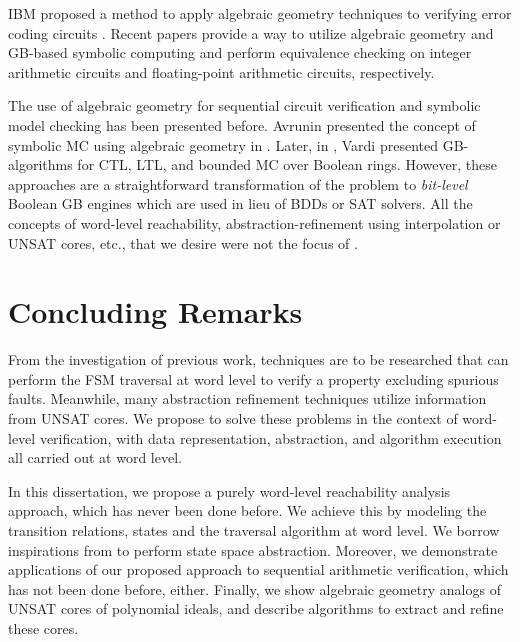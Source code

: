 IBM proposed a method to apply algebraic geometry techniques 
to verifying error coding circuits \cite{BLUEVERI}.
Recent papers \cite{rolf:date16,rolf:FMCAD16} provide a way to utilize 
algebraic geometry and GB-based symbolic computing and perform 
equivalence checking on integer arithmetic circuits and floating-point 
arithmetic circuits, respectively.

The use of algebraic geometry
for sequential circuit verification and symbolic model checking has
been presented before. Avrunin presented the
concept of symbolic MC using algebraic geometry in
\cite{Avrunin:CAV}. Later, in \cite{vardi-iasted07}, Vardi presented
GB-algorithms for CTL, LTL, and 
bounded MC over Boolean rings. However, these approaches are a
straightforward transformation of the problem to {\it bit-level}
Boolean GB engines which are used in lieu of BDDs or SAT solvers. All
the concepts of word-level reachability, abstraction-refinement using
interpolation or UNSAT cores, etc., that we desire were not the focus of
\cite{Avrunin:CAV,vardi-iasted07}. 

\section{Concluding Remarks}
From the investigation of previous work, techniques are to be researched that 
can perform the FSM traversal at word level to verify a property excluding spurious 
faults. Meanwhile, many abstraction refinement techniques utilize information from UNSAT cores.
We propose to solve these problems in the context of word-level verification,
with data representation, abstraction, and algorithm execution all carried out 
at word level.

In this dissertation, we propose a purely word-level reachability analysis approach, which has never been done before.
We achieve this by modeling the transition relations, states and the traversal algorithm at word level.
We borrow inspirations from \cite{tim:phd,gao:qe-gf-gb} to perform state space abstraction.
Moreover, we demonstrate applications of our proposed approach to sequential arithmetic verification, which has 
not been done before, either.
Finally, we show algebraic geometry analogs of UNSAT cores of polynomial ideals, and describe algorithms
to extract and refine these cores.